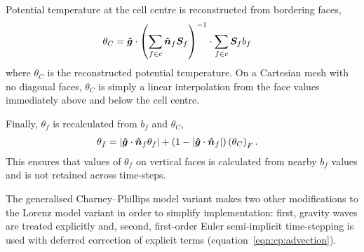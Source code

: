 Potential temperature at the cell centre is reconstructed from bordering faces,
\begin{align}
	\theta_C &= \bm{\hat{g}} \cdot \left( \sum_{f \in c} \bm{\hat{n}}_f \bm{S}_f \right)^{-1} \cdot \sum_{f \in c} \bm{S}_f b_f \label{eqn:cp:reconstruct}
\end{align}
where $\theta_C$ is the reconstructed potential temperature.  On a Cartesian mesh with no diagonal faces, $\theta_C$ is simply a linear interpolation from the face values immediately above and below the cell centre.

Finally, $\theta_f$ is recalculated from $b_f$ and $\theta_C$,
\begin{align}
	\theta_f &= \left\lvert  \bm{\hat{g}} \cdot \bm{\hat{n}}_f \theta_f \right\rvert + \left( 1 - \left\lvert \bm{\hat{g}} \cdot \bm{\hat{n}}_f  \right\rvert \right) \left( \theta_C \right)_F \text{.}
\end{align}
This ensures that values of $\theta_f$ on vertical faces is calculated from nearby $b_f$ values and is not retained across time-steps.

The generalised Charney--Phillips model variant makes two other modifications to the Lorenz model variant in order to simplify implementation: first, gravity waves are treated explicitly and, second, first-order Euler semi-implicit time-stepping is used with deferred correction of explicit terms (equation~\ref{eqn:cp:advection}).

